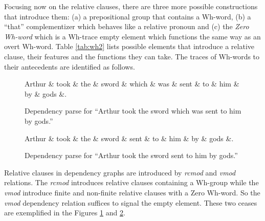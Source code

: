     Focusing now on the relative clauses, there are three more possible constructions that introduce them: (a) a prepositional group that contains a Wh-word, (b) a ``that'' complementizer which behaves like a relative pronoun and (c) the \textit{Zero Wh-word} which is a Wh-trace empty element which functions the same way as an overt Wh-word. Table \ref{tab:wh2} lists possible elements that introduce a relative clause, their features and the functions they can take. The traces of Wh-words to their antecedents are identified as follows. 

    \begin{figure}[!ht]
    	\centering
    	\begin{dependency}
    		\begin{deptext}[]
    			Arthur \& took \& the \& sword \& which \& was \& sent \& to \& him \& by \& gods \&. \\
    		\end{deptext}
    	\end{dependency}
    	\caption{Dependency parse for ``Arthur took the sword which was sent to him by gods.''}
    	\label{fig:e20}
        \end{figure}
        
        \begin{figure}[!ht]
    	\centering
    	\begin{dependency}
    		\begin{deptext}[]
    			Arthur \& took \& the \& sword \& sent \& to \& him \& by \& gods \&. \\
    		\end{deptext}
    	\end{dependency}
    	\caption{Dependency parse for ``Arthur took the sword sent to him by gods.''}
    	\label{fig:e21}
    \end{figure}

    Relative clauses in dependency graphs are introduced by \textit{rcmod} and \textit{vmod} relations. The \textit{rcmod} introduces relative clauses containing a Wh-group while the \textit{vmod} introduce finite and non-finite relative clauses with a Zero Wh-word. So the \textit{vmod} dependency relation suffices to signal the empty element. These two ceases are exemplified in the Figures  \ref{fig:e20} and \ref{fig:e21}.

